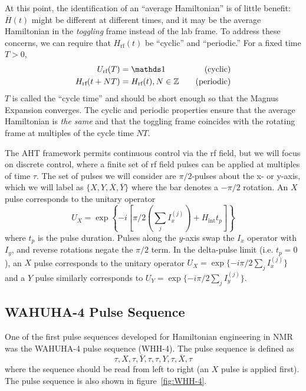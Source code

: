 At this point, the identification of an ``average Hamiltonian'' is of little benefit: $\overline{H}(t)$ might be different at different times, and it may be the average Hamiltonian in the \emph{toggling} frame instead of the lab frame. To address these concerns, we can require that $H_\text{rf}(t)$ be ``cyclic'' and ``periodic.'' For a fixed time $T>0$,
\begin{align}\label{eq:AHT-constraints}
    U_{\text{rf}}(T) &= \identity & \quad \text{(cyclic)} \\
    H_{\text{rf}}(t + NT) &= H_{\text{rf}}(t), N \in \Z & \quad \text{(periodic)}
\end{align}
$T$ is called the ``cycle time'' and should be short enough so that the Magnus Expansion converges.
The cyclic and periodic properties ensure that the average Hamiltonian is \emph{the same} and that the toggling frame coincides with the rotating frame at multiples of the cycle time $NT$.

The AHT framework permits continuous control via the rf field, but we will focus on discrete control, where a finite set of rf field pulses can be applied at multiples of time $\tau$. The set of pulses we will consider are $\pi/2$-pulses about the x- or y-axis, which we will label as $\{ X, Y, \overline{X}, \overline{Y} \}$ where the bar denotes a $-\pi/2$ rotation. An $X$ pulse corresponds to the unitary operator
\begin{equation}\label{eq:X-pulse}
    U_X = \exp\left\{-i
        \left[
            \pi/2 \left(\sum_j I_x^{(j)}\right) + H_{\text{int}} t_p
        \right]
    \right\}
\end{equation}
where $t_p$ is the pulse duration. Pulses along the $y$-axis swap the $I_x$ operator with $I_y$, and reverse rotations negate the $\pi/2$ term. In the delta-pulse limit (i.e. $t_p = 0$), an $X$ pulse corresponds to the unitary operator $U_X = \exp\{-i \pi/2 \sum_j I_x^{(j)}\}$ and a $Y$ pulse similarly corresponds to $U_Y = \exp\{-i \pi/2 \sum_j I_y^{(j)}\}$.

\subsection{WAHUHA-4 Pulse Sequence}\label{subsec:WHH-4}

One of the first pulse sequences developed for Hamiltonian engineering in NMR was the WAHUHA-4 pulse sequence (WHH-4).\cite{PhysRevLett.20.180} The pulse sequence is defined as
\begin{equation}
    \tau, X, \tau, \overline{Y}, \tau, \tau, Y, \tau, \overline{X}, \tau
\end{equation}
where the sequence should be read from left to right (an $X$ pulse is applied first). The pulse sequence is also shown in figure~\ref{fig:WHH-4}.


